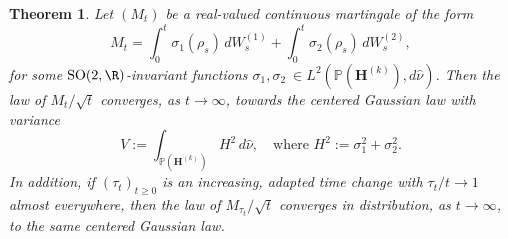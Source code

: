 \documentclass[JEP,XML,SOM,Unicode,published]{cedram}
\theoremstyle{plain}
\newtheorem{thm}{Theorem}[section]
\theoremstyle{definition}
\numberwithin{equation}{subsection}
\newcommand\bP{\mathbb{P}}
\newcommand{\SO}{\mathrm{SO}}
\newcommand{\bfH}{\boldsymbol{H}}
\newcommand{\defeq}{:=}
\begin{document}
\begin{thm}\label{flj:mclt} Let \((M_t)\) be a real-valued continuous martingale of the form
\[
M_t =
\int_0^t \sigma_1(\rho_s) \, dW_s^{(1)} + \int_0^t \sigma_2(\rho_s) \, dW_s^{(2)},
\]
for some $\SO(2, \R)$-invariant functions \(\sigma_1, \sigma_2\ \in L^2(\bP(\bfH^{(k)}), d\hat{\nu})\). Then the law of \(M_t / \sqrt{t}\) converges, as \(t \to \infty\), towards the centered Gaussian law with variance
\[
V\defeq \int_{\bP(\bfH^{(k)})} H^2 \, d\hat\nu, \quad \text{where } H^2 := \sigma_1^2+\sigma_2^2.
\]
In addition, if \((\tau_t)_{t \geq 0} \) is an increasing, adapted time change with \(\tau_t/t \to 1 \) almost everywhere,
then the law of \(M_{\tau_t} / \sqrt{t}\) converges in distribution, as \(t \to \infty\), to the same centered Gaussian law.

\end{thm}
\end{document}
